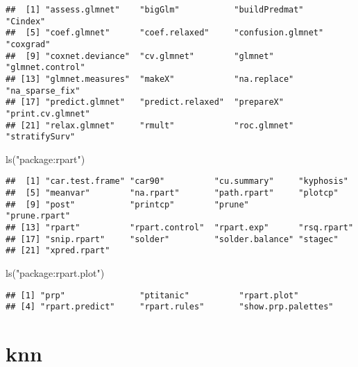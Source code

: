 \documentclass[
]{book}
\newenvironment{Shaded}{\begin{snugshade}}{\end{snugshade}}
\newcommand{\FunctionTok}[1]{\textcolor[rgb]{0.00,0.00,0.00}{#1}}
\newcommand{\NormalTok}[1]{#1}
\newcommand{\StringTok}[1]{\textcolor[rgb]{0.31,0.60,0.02}{#1}}
\begin{document}
\begin{verbatim}
##  [1] "assess.glmnet"    "bigGlm"           "buildPredmat"     "Cindex"          
##  [5] "coef.glmnet"      "coef.relaxed"     "confusion.glmnet" "coxgrad"         
##  [9] "coxnet.deviance"  "cv.glmnet"        "glmnet"           "glmnet.control"  
## [13] "glmnet.measures"  "makeX"            "na.replace"       "na_sparse_fix"   
## [17] "predict.glmnet"   "predict.relaxed"  "prepareX"         "print.cv.glmnet" 
## [21] "relax.glmnet"     "rmult"            "roc.glmnet"       "stratifySurv"
\end{verbatim}

\begin{Shaded}
\begin{Highlighting}[]
\FunctionTok{ls}\NormalTok{(}\StringTok{"package:rpart"}\NormalTok{)}
\end{Highlighting}
\end{Shaded}

\begin{verbatim}
##  [1] "car.test.frame" "car90"          "cu.summary"     "kyphosis"      
##  [5] "meanvar"        "na.rpart"       "path.rpart"     "plotcp"        
##  [9] "post"           "printcp"        "prune"          "prune.rpart"   
## [13] "rpart"          "rpart.control"  "rpart.exp"      "rsq.rpart"     
## [17] "snip.rpart"     "solder"         "solder.balance" "stagec"        
## [21] "xpred.rpart"
\end{verbatim}

\begin{Shaded}
\begin{Highlighting}[]
\FunctionTok{ls}\NormalTok{(}\StringTok{"package:rpart.plot"}\NormalTok{)}
\end{Highlighting}
\end{Shaded}

\begin{verbatim}
## [1] "prp"               "ptitanic"          "rpart.plot"       
## [4] "rpart.predict"     "rpart.rules"       "show.prp.palettes"
\end{verbatim}

\hypertarget{knn}{%
\section{knn}\label{knn}}
\end{document}
